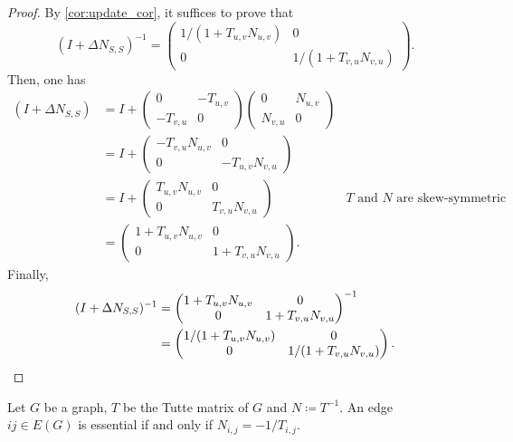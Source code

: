 \begin{proof}
By \cref{cor:update_cor}, it suffices to prove that 
\[
    (I + \Delta N_{S, S})^{-1} = 
    \begin{pmatrix}
        1 / (1 + T_{u, v}N_{u, v}) & 0 \\
        0 &  1 / (1 + T_{v, u}N_{v, u})
    \end{pmatrix}.
\]
Then, one has
\begin{align*}
    (I + \Delta N_{S, S}) &= I + 
    \begin{pmatrix} 0 & -T_{u,v} \\ -T_{v, u} & 0 \end{pmatrix} 
    \begin{pmatrix} 0 & N_{u, v} \\ N_{v, u} & 0\end{pmatrix} & \\
    &= I + 
    \begin{pmatrix} -T_{v, u}N_{u, v} & 0  \\ 0 & -T_{u, v}N_{v, u} \end{pmatrix} & \\
    &= I + 
    \begin{pmatrix} T_{u, v}N_{u, v} & 0  \\ 0 & T_{v, u}N_{v, u} \end{pmatrix} & \text{\(T\) and \(N\) are skew-symmetric} \\
    &= 
    \begin{pmatrix} 1 + T_{u, v}N_{u, v} & 0  \\ 0 & 1 + T_{v, u}N_{v, u} \end{pmatrix}. &
\end{align*}
Finally, 
\begin{align*}
    (I + \Delta N_{S, S})^{-1} 
    &= \begin{pmatrix} 1 + T_{u, v}N_{u, v} & 0  \\ 0 & 1 + T_{v, u}N_{v, u} \end{pmatrix}^{-1} \\
    &= \begin{pmatrix} 1 / (1 + T_{u, v}N_{u, v}) & 0  \\ 0 & 1 / (1 + T_{v, u}N_{v, u}) \end{pmatrix}. \qedhere
\end{align*}
\end{proof}

\begin{corollary}
    \label{cor:condition_edge_removal}
    Let \(G\) be a graph, \(T\) be the Tutte matrix of \(G\) and \(N \coloneqq T^{-1}\).
    An edge \(ij \in E(G)\) is essential if and only if \(N_{i,j} = -1/T_{i,j}\).
\end{corollary}

